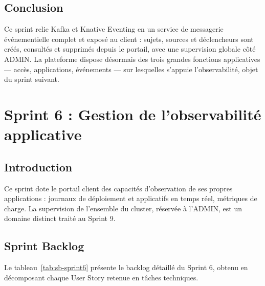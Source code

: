 \subsection{Conclusion}

Ce sprint relie Kafka et Knative Eventing en un service de messagerie événementielle complet et exposé au client : sujets, sources et déclencheurs sont créés, consultés et supprimés depuis le portail, avec une supervision globale côté ADMIN. La plateforme dispose désormais des trois grandes fonctions applicatives — accès, applications, événements — sur lesquelles s'appuie l'observabilité, objet du sprint suivant.

\section{Sprint 6 : Gestion de l'observabilité applicative}

\subsection{Introduction}

Ce sprint dote le portail client des capacités d'observation de ses propres applications : journaux de déploiement et applicatifs en temps réel, métriques de charge. La supervision de l'ensemble du cluster, réservée à l'ADMIN, est un domaine distinct traité au Sprint 9.
\subsection{Sprint Backlog}
Le tableau~\ref{tab:sb-sprint6} présente le backlog détaillé du Sprint 6, obtenu en décomposant chaque User Story retenue en tâches techniques.

